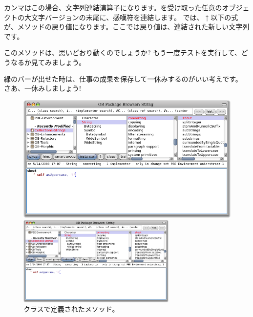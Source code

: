 \documentclass[a4paper,10pt,twoside]{book}
\begin{document}
カンマはこの場合、文字列連結演算子になります。を受け取った任意のオブジェクトの大文字バージョンの末尾に、感嘆符を連結します。
\pharo では、$\uparrow$以下の式が、メソッドの戻り値になります。ここでは戻り値は、連結された新しい文字列です。

このメソッドは、思いどおり動くのでしょうか? もう一度テストを実行して、どうなるか見てみましょう。

緑のバーが出せた時は、仕事の成果を保存して一休みするのがいい考えです。
さあ、一休みしましょう!

\begin{figure}[hbt]
\ifluluelse
	{\centerline{\includegraphics[width=\textwidth]{String-Shout}}}
	{\centerline{\includegraphics[width=0.7\textwidth]{String-Shout}}}
\caption{クラスで定義されたメソッド。
}
\end{figure}
\end{document}
